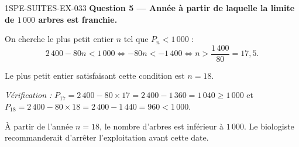 \begin{corrige}{1SPE-SUITES-EX-033}
\medskip
\textbf{Question 5 — Année à partir de laquelle la limite de $1\,000$ arbres est franchie.}

On cherche le plus petit entier $n$ tel que $P_n < 1\,000$ :
\[
  2\,400 - 80n < 1\,000 \iff -80n < -1\,400 \iff n > \frac{1\,400}{80} = 17{,}5.
\]

Le plus petit entier satisfaisant cette condition est $n = 18$.

\textit{Vérification :} $P_{17} = 2\,400 - 80 \times 17 = 2\,400 - 1\,360 = 1\,040 \geq 1\,000$ et $P_{18} = 2\,400 - 80 \times 18 = 2\,400 - 1\,440 = 960 < 1\,000$. \checkmark


À partir de l'année $n = 18$, le nombre d'arbres est inférieur à $1\,000$. Le biologiste recommanderait d'arrêter l'exploitation avant cette date.

\end{corrige}
